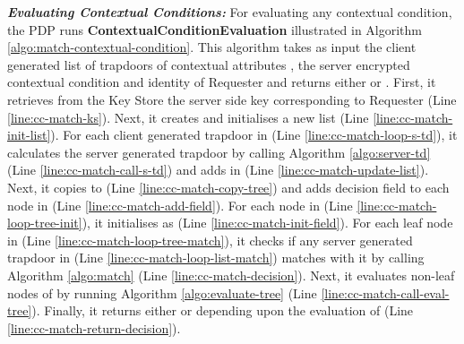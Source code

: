 \documentclass[final,5p,times,twocolumn]{elsarticle}
\begin{document}
\emph{\textbf{Evaluating Contextual Conditions:}}
For evaluating any contextual condition, the PDP runs \textbf{ContextualConditionEvaluation} illustrated in Algorithm \ref{algo:match-contextual-condition}. This algorithm takes as input the client generated list of trapdoors of contextual attributes , the server encrypted contextual condition  and identity of Requester  and returns either  or . First, it retrieves from the Key Store the server side key  corresponding to Requester  (Line \ref{line:cc-match-ks}). Next, it creates and initialises a new list  (Line \ref{line:cc-match-init-list}). For each client generated trapdoor  in  (Line \ref{line:cc-match-loop-s-td}), it calculates the server generated trapdoor  by calling Algorithm \ref{algo:server-td} (Line \ref{line:cc-match-call-s-td}) and adds  in  (Line \ref{line:cc-match-update-list}). Next, it copies  to  (Line \ref{line:cc-match-copy-tree}) and adds decision field to each node in  (Line \ref{line:cc-match-add-field}). For each node  in  (Line \ref{line:cc-match-loop-tree-init}), it initialises  as  (Line \ref{line:cc-match-init-field}). For each leaf node  in  (Line \ref{line:cc-match-loop-tree-match}), it checks if any server generated trapdoor  in  (Line \ref{line:cc-match-loop-list-match}) matches with it by calling Algorithm \ref{algo:match} (Line \ref{line:cc-match-decision}). Next, it evaluates non-leaf nodes of  by running Algorithm \ref{algo:evaluate-tree} (Line \ref{line:cc-match-call-eval-tree}). Finally, it returns either  or  depending upon the evaluation of  (Line \ref{line:cc-match-return-decision}). 
\end{document}
